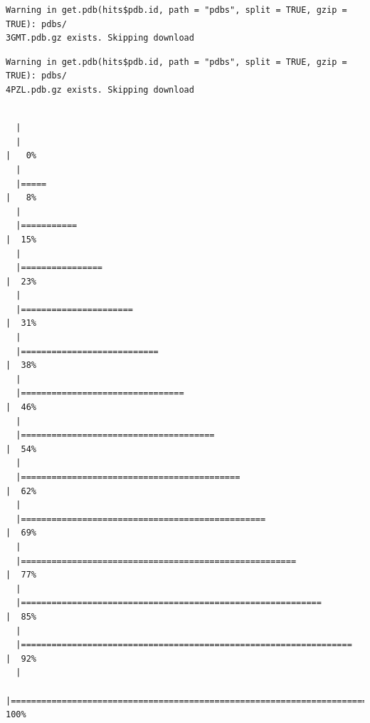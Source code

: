 \documentclass[
  letterpaper,
  DIV=11,
  numbers=noendperiod]{scrartcl}
\begin{document}
\begin{verbatim}
Warning in get.pdb(hits$pdb.id, path = "pdbs", split = TRUE, gzip = TRUE): pdbs/
3GMT.pdb.gz exists. Skipping download
\end{verbatim}

\begin{verbatim}
Warning in get.pdb(hits$pdb.id, path = "pdbs", split = TRUE, gzip = TRUE): pdbs/
4PZL.pdb.gz exists. Skipping download
\end{verbatim}

\begin{verbatim}

  |                                                                            
  |                                                                      |   0%
  |                                                                            
  |=====                                                                 |   8%
  |                                                                            
  |===========                                                           |  15%
  |                                                                            
  |================                                                      |  23%
  |                                                                            
  |======================                                                |  31%
  |                                                                            
  |===========================                                           |  38%
  |                                                                            
  |================================                                      |  46%
  |                                                                            
  |======================================                                |  54%
  |                                                                            
  |===========================================                           |  62%
  |                                                                            
  |================================================                      |  69%
  |                                                                            
  |======================================================                |  77%
  |                                                                            
  |===========================================================           |  85%
  |                                                                            
  |=================================================================     |  92%
  |                                                                            
  |======================================================================| 100%
\end{verbatim}
\end{document}
